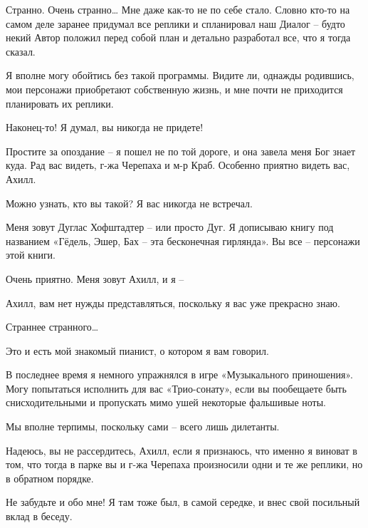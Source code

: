 \documentclass[../main.tex]{subfiles}
\begin{document}
\begin{dialogue}

 Странно. Очень странно\ldots{} Мне даже как-то не по себе стало. Словно кто-то на самом деле заранее придумал все реплики и спланировал наш Диалог \--- будто некий Автор положил перед собой план и детально разработал все, что я тогда сказал.


 Я вполне могу обойтись без такой программы. Видите ли, однажды родившись, мои персонажи приобретают собственную жизнь, и мне почти не приходится планировать их реплики.

 Наконец-то! Я думал, вы никогда не придете!

 Простите за опоздание \--- я пошел не по той дороге, и она завела меня Бог знает куда. Рад вас видеть, г-жа Черепаха и м-р Краб. Особенно приятно видеть вас, Ахилл.

 Можно узнать, кто вы такой? Я вас никогда не встречал.

 Меня зовут Дуглас Хофштадтер \--- или просто Дуг. Я дописываю книгу под названием «Гёдель, Эшер, Бах \--- эта бесконечная гирлянда». Вы все \--- персонажи этой книги.

 Очень приятно. Меня зовут Ахилл, и я \---

 Ахилл, вам нет нужды представляться, поскольку я вас уже прекрасно знаю.

 Страннее странного\ldots{}

 Это и есть мой знакомый пианист, о котором я вам говорил.

 В последнее время я немного упражнялся в игре «Музыкального приношения». Могу попытаться исполнить для вас «Трио-сонату», если вы пообещаете быть снисходительными и пропускать мимо ушей некоторые фальшивые ноты.

 Мы вполне терпимы, поскольку сами \--- всего лишь дилетанты.

 Надеюсь, вы не рассердитесь, Ахилл, если я признаюсь, что именно я виноват в том, что тогда в парке вы и г-жа Черепаха произносили одни и те же реплики, но в обратном порядке.

 Не забудьте и обо мне! Я там тоже был, в самой середке, и внес свой посильный вклад в беседу.


\end{dialogue}
\end{document}
